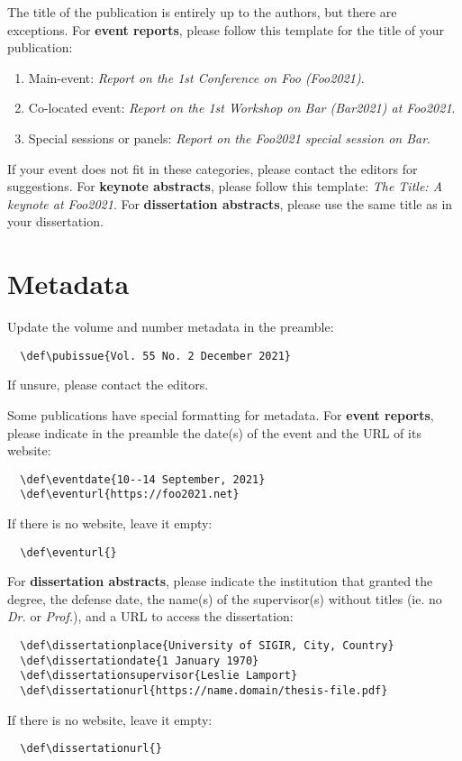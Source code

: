 \documentclass[news]{sigirforum}
\def\pubissue{Vol. 55 No. 2 December 2021}
\def\eventdate{10--14 September, 2021}
\def\eventurl{https://foo2021.net}
\def\dissertationplace{University of SIGIR, City, Country}
\def\dissertationdate{1 January 1970} %
\def\dissertationsupervisor{Leslie Lamport} %
\def\dissertationurl{https://name.domain/thesis-file.pdf}
\begin{document}
The title of the publication is entirely up to the authors, but there are exceptions. For \textbf{event reports}, please follow this template for the title of your publication:
\begin{enumerate}
	\item Main-event: \textsl{Report on the 1st Conference on Foo (Foo2021)}.
	\item Co-located event: \textsl{Report on the 1st Workshop on Bar (Bar2021) at Foo2021}.
	\item Special sessions or panels: \textsl{Report on the Foo2021 special session on Bar}.
\end{enumerate}

If your event does not fit in these categories, please contact the editors for suggestions. For \textbf{keynote abstracts}, please follow this template: \textsl{The Title: A keynote at Foo2021}. For \textbf{dissertation abstracts}, please use the same title as in your dissertation.

\section{Metadata}

Update the volume and number metadata in the preamble:
\begin{verbatim}
  \def\pubissue{Vol. 55 No. 2 December 2021}
\end{verbatim}
If unsure, please contact the editors.

Some publications have special formatting for metadata. For \textbf{event reports}, please indicate in the preamble the date(s) of the event and the URL of its website:
\begin{verbatim}
  \def\eventdate{10--14 September, 2021}
  \def\eventurl{https://foo2021.net}
\end{verbatim}
If there is no website, leave it empty:
\begin{verbatim}
  \def\eventurl{}
\end{verbatim}

For \textbf{dissertation abstracts}, please indicate the institution that granted the degree, the defense date, the name(s) of the supervisor(s) without titles (ie. no \textsl{Dr.} or \textsl{Prof.}), and a URL to access the dissertation:
\begin{verbatim}
  \def\dissertationplace{University of SIGIR, City, Country}
  \def\dissertationdate{1 January 1970}
  \def\dissertationsupervisor{Leslie Lamport}
  \def\dissertationurl{https://name.domain/thesis-file.pdf}
\end{verbatim}
If there is no website, leave it empty:
\begin{verbatim}
  \def\dissertationurl{}
\end{verbatim}
\end{document}
